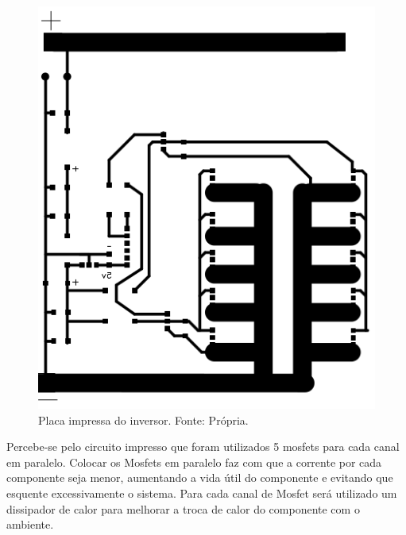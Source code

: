                 \begin{figure}[!htb]
            		\centering
            		\includegraphics[scale= 0.4]{figuras/Placa_inversor.png}
            		\caption{Placa impressa do inversor. Fonte: Própria.}
            		\label{inversor-projeto}
            	\end{figure} 		

				Percebe-se pelo circuito impresso que foram utilizados 5 mosfets para cada 						canal em paralelo. Colocar os Mosfets em paralelo faz com que a corrente por 					cada componente seja menor, aumentando a vida útil do componente e evitando 					que esquente excessivamente o sistema. Para cada canal de Mosfet será 							utilizado um dissipador de calor para melhorar a troca de calor do componente 					com o ambiente.		
		
